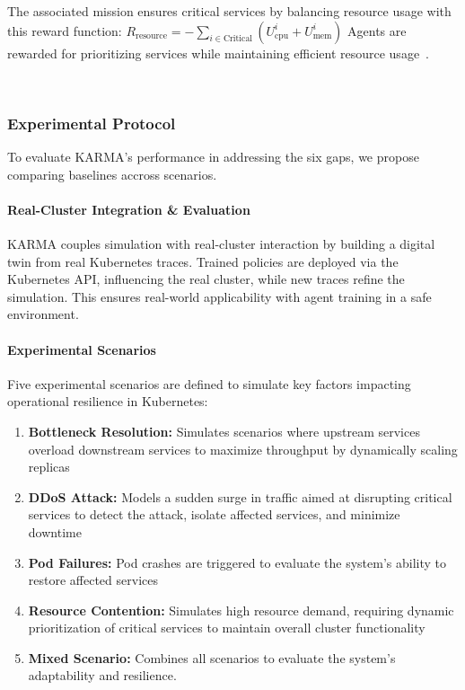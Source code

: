 The associated mission ensures critical services by balancing resource usage with this reward function:
$R_{\text{resource}} = - \sum_{i \in \text{Critical}} \left( U_{\text{cpu}}^i + U_{\text{mem}}^i \right)$
Agents are rewarded for prioritizing services while maintaining efficient resource usage~\cite{shahrad2020resource}.

\

\subsubsection{Experimental Protocol}

\noindent To evaluate KARMA's performance in addressing the six gaps, we propose comparing baselines accross scenarios.

\paragraph{\textbf{Real-Cluster Integration \& Evaluation}}

KARMA couples simulation with real-cluster interaction by building a digital twin from real Kubernetes traces. Trained policies are deployed via the Kubernetes API, influencing the real cluster, while new traces refine the simulation. This ensures real-world applicability with agent training in a safe environment.

\paragraph{\textbf{Experimental Scenarios}}

\noindent Five experimental scenarios are defined to simulate key factors impacting operational resilience in Kubernetes:
%
\begin{enumerate}[label=\textbf{\arabic*)}, itemjoin={;\quad }]
    \item \textbf{Bottleneck Resolution:} Simulates scenarios where upstream services overload downstream services to maximize throughput by dynamically scaling replicas
    \item \textbf{DDoS Attack:} Models a sudden surge in traffic aimed at disrupting critical services to detect the attack, isolate affected services, and minimize downtime~\cite{Liu2018}
    \item \textbf{Pod Failures:} Pod crashes are triggered to evaluate the system's ability to restore affected services~\cite{burns2016borg}
    \item \textbf{Resource Contention:} Simulates high resource demand, requiring dynamic prioritization of critical services to maintain overall cluster functionality~\cite{Vhatkar2022}
    \item \textbf{Mixed Scenario:} Combines all scenarios to evaluate the system's adaptability and resilience.
\end{enumerate}

